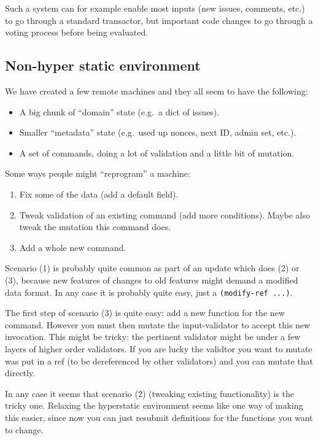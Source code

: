 \documentclass[a4paper, oneside, 10pt]{amsart}
\begin{document}
Such a system can for example enable most inputs (new issues, comments, etc.) to
go through a standard transactor, but important code changes to go through a
voting process before being evaluated.

\subsection{Non-hyper static environment}

We have created a few remote machines and they all seem to have the
following:
\begin{itemize}
\item
  A big chunk of ``domain'' state (e.g.~a dict of issues).
\item
  Smaller ``metadata'' state (e.g.~used up nonces, next ID, admin set,
  etc.).
\item
  A set of commands, doing a lot of validation and a little bit of
  mutation.
\end{itemize}

Some ways people might ``reprogram'' a machine:
\begin{enumerate}
\def\labelenumi{\arabic{enumi}.}
\item
  Fix some of the data (add a default field).
\item
  Tweak validation of an existing command (add more conditions). Maybe
  also tweak the mutation this command does.
\item
  Add a whole new command.
\end{enumerate}

Scenario (1) is probably quite common as part of an update which does
(2) or (3), because new features of changes to old features might demand
a modified data format. In any case it is probably quite easy, just a
\texttt{(modify-ref\ ...)}.

The first step of scenario (3) is quite easy: add a new function for the
new command. However you must then mutate the input-validator to accept
this new invocation. This might be tricky: the pertinent validator might
be under a few layers of higher order validators. If you are lucky the
validtor you want to mutate was put in a ref (to be dereferenced by
other validators) and you can mutate that directly.

In any case it seems that scenario (2) (tweaking existing functionality)
is the tricky one. Relaxing the hyperstatic environment seems like one
way of making this easier, since now you can just resubmit definitions
for the functions you want to change.
\end{document}
